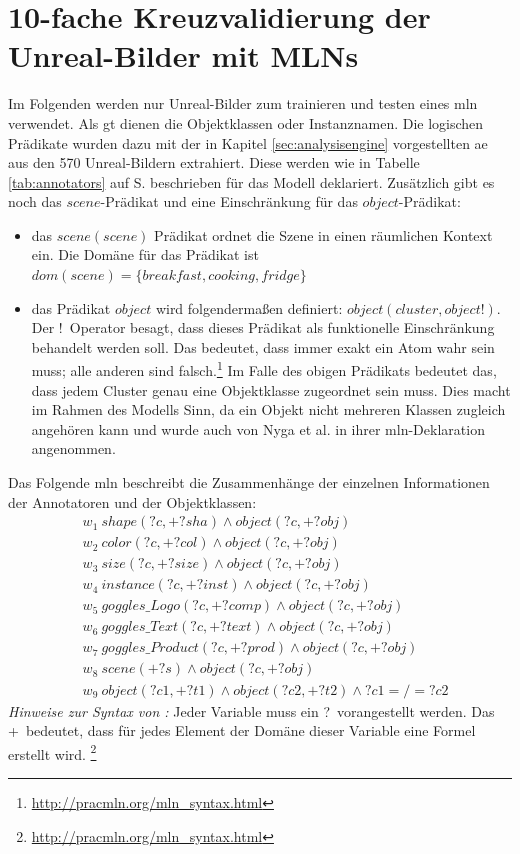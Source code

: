 
\section{10-fache Kreuzvalidierung der Unreal-Bilder mit MLNs}
\label{sec:onlyUnrealImages}
Im Folgenden werden nur Unreal-Bilder zum trainieren und testen eines \gls{mln} verwendet. Als \gls{gt} dienen die Objektklassen oder Instanznamen. Die logischen Prädikate wurden dazu mit der in Kapitel \ref{sec:analysisengine} vorgestellten \gls{ae} aus den 570 Unreal-Bildern extrahiert. Diese werden wie in Tabelle \ref{tab:annotators} auf S.\pageref{tab:annotators} beschrieben für das Modell deklariert.  Zusätzlich gibt es noch das $scene$-Prädikat und eine Einschränkung für das $object$-Prädikat:
\begin{itemize}
\item das $scene(scene)$ Prädikat ordnet die Szene in einen räumlichen Kontext ein. Die Domäne für das Prädikat ist $dom(scene) = \{breakfast, cooking, fridge\}$
\item das Prädikat $object$ wird folgendermaßen definiert: $object(cluster, object!)$. Der \glqq!\grqq \ Operator besagt, dass dieses Prädikat als funktionelle Einschränkung behandelt werden soll. Das bedeutet, dass immer exakt ein Atom wahr sein muss; alle anderen sind falsch.\footnote{\url{http://pracmln.org/mln_syntax.html}} Im Falle des obigen Prädikats bedeutet das, dass jedem Cluster genau eine Objektklasse zugeordnet sein muss. Dies macht im Rahmen des Modells Sinn, da ein Objekt nicht mehreren Klassen zugleich angehören kann und wurde auch von Nyga et al.\cite{pr2looking} in ihrer \gls{mln}-Deklaration angenommen.
\end{itemize}
Das Folgende \gls{mln} beschreibt die Zusammenhänge der einzelnen Informationen der Annotatoren und der Objektklassen:
\begin{align*}
& w_{1} \ shape(?c, +?sha) \wedge object(?c, +?obj) \\
& w_{2} \ color(?c, +?col) \wedge object(?c, +?obj) \\
& w_{3} \ size(?c, +?size) \wedge object(?c, +?obj) \\
& w_{4} \ instance(?c, +?inst) \wedge object(?c, +?obj) \\
& w_{5} \ goggles\_Logo(?c, +?comp) \wedge object(?c, +?obj)\\
& w_{6} \ goggles\_Text(?c, +?text) \wedge object(?c, +?obj)\\
& w_{7} \ goggles\_Product(?c, +?prod) \wedge object(?c, +?obj)\\
& w_{8} \ scene(+?s) \wedge object(?c, +?obj)\\
& w_{9} \ object(?c1, +?t1) \wedge object(?c2, +?t2) \wedge ?c1 =/= ?c2
\end{align*}
\textit{Hinweise zur Syntax von \pracmln:} Jeder Variable muss ein \glqq ?\grqq \ vorangestellt werden. Das \glqq +\grqq \ bedeutet, dass für jedes Element der Domäne dieser Variable eine Formel erstellt wird. \footnote{\url{http://pracmln.org/mln_syntax.html}}  \par
 

